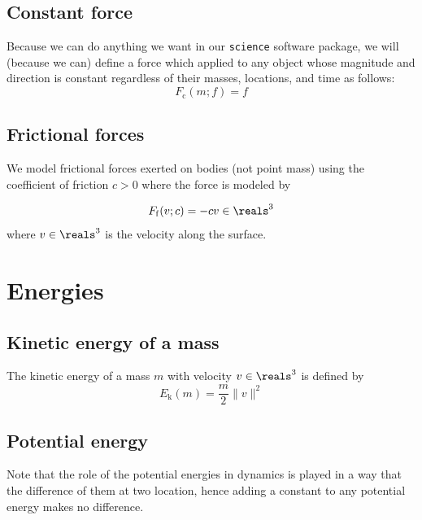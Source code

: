 \documentclass{article}
\begin{document}
\subsection{Constant force}

Because we can do anything we want in our {\tt science} software package,
we will (because we can) define a force which applied to any object
whose magnitude and direction is constant regardless of their masses, locations, and time
as follows:
\begin{equation}
\label{eq:force:constant}
	F_\mathrm{c}(m;f) = f
\end{equation}

\subsection{Frictional forces}
\label{subsection:frictional-forces}

We model frictional forces exerted on bodies (not point mass)
using the coefficient of friction $c>0$ where the force is modeled by

\begin{equation}
\label{eq:force:frictional}
F_\mathrm{f}(v;c) = -c v
	\in\reals^3
\end{equation}
where $v\in\reals^3$ is the velocity along the surface.

\section{Energies}

\subsection{Kinetic energy of a mass}

The kinetic energy of a mass $m$ with velocity $v\in\reals^3$
is defined by
\begin{equation}
\label{eq:energy:kinetic}
	E_\mathrm{k}(m) = \frac{m}{2} \|v\|^2
\end{equation}

\subsection{Potential energy}

Note that the role of the potential energies in dynamics
is played in a way that the difference of them at two location,
hence adding a constant to any potential energy
makes no difference.
\end{document}

